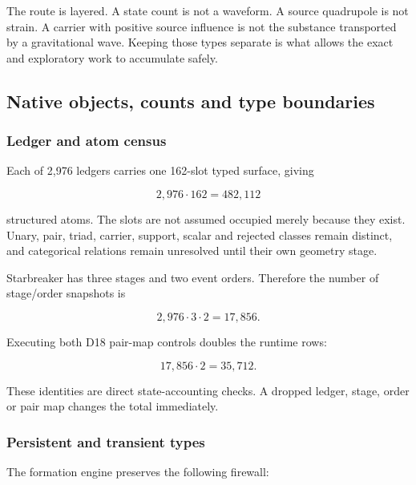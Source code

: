 The route is layered. A state count is not a waveform. A source
quadrupole is not strain. A carrier with positive source influence is
not the substance transported by a gravitational wave. Keeping those
types separate is what allows the exact and exploratory work to
accumulate safely.

\subsection{Native objects, counts and type
boundaries}\label{viii-ch08-native-objects-counts-and-type-boundaries}

\subsubsection{Ledger and atom census}\label{viii-ch08-ledger-and-atom-census}

Each of 2,976 ledgers carries one 162-slot typed surface, giving

\[
2{,}976\cdot162=482{,}112
\]

structured atoms. The slots are not assumed occupied merely because they
exist. Unary, pair, triad, carrier, support, scalar and rejected classes
remain distinct, and categorical relations remain unresolved until their
own geometry stage.

Starbreaker has three stages and two event orders. Therefore the number
of stage/order snapshots is

\[
2{,}976\cdot3\cdot2=17{,}856.
\]

Executing both D18 pair-map controls doubles the runtime rows:

\[
17{,}856\cdot2=35{,}712.
\]

These identities are direct state-accounting checks. A dropped ledger,
stage, order or pair map changes the total immediately.

\subsubsection{Persistent and transient
types}\label{viii-ch08-persistent-and-transient-types}

The formation engine preserves the following firewall:

